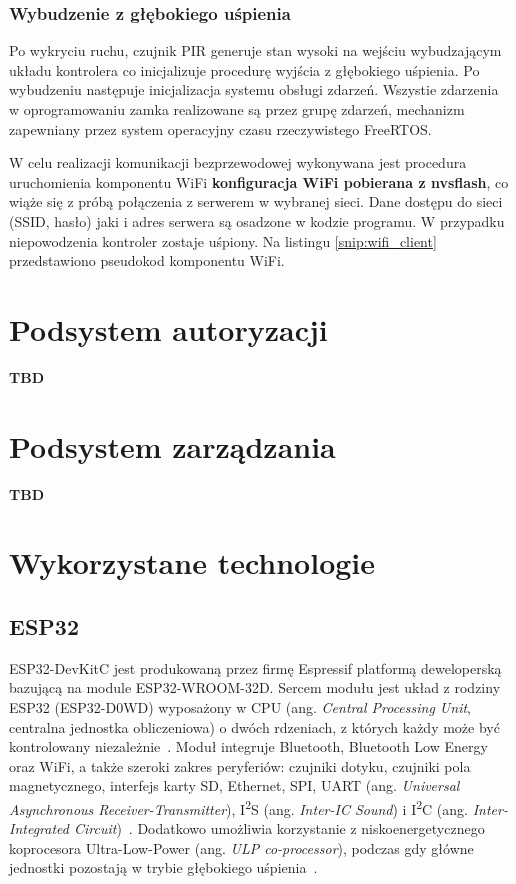             \subsubsection{Wybudzenie z głębokiego uśpienia}

                Po wykryciu ruchu, czujnik PIR generuje stan wysoki na wejściu wybudzającym układu kontrolera co inicjalizuje procedurę wyjścia z głębokiego uśpienia. Po wybudzeniu następuje inicjalizacja systemu obsługi zdarzeń. Wszystie zdarzenia w oprogramowaniu zamka realizowane są przez grupę zdarzeń, mechanizm zapewniany przez system operacyjny czasu rzeczywistego FreeRTOS.

                W celu realizacji komunikacji bezprzewodowej wykonywana jest procedura uruchomienia komponentu WiFi \textbf{konfiguracja WiFi pobierana z nvsflash}, co wiąże się z próbą połączenia z serwerem w wybranej sieci. Dane dostępu do sieci (SSID, hasło) jaki i adres serwera są osadzone w kodzie programu. W przypadku niepowodzenia kontroler zostaje uśpiony. Na listingu \ref{snip:wifi_client} przedstawiono pseudokod komponentu WiFi. 

                

    \section{Podsystem autoryzacji}
        \textbf{TBD}

    \section{Podsystem zarządzania}
        \textbf{TBD}

    \section {Wykorzystane technologie}

        \subsection{ESP32}

            ESP32-DevKitC jest produkowaną przez firmę Espressif platformą deweloperską bazującą na module ESP32-WROOM-32D. Sercem modułu jest układ z rodziny ESP32 (ESP32-D0WD) wyposażony w CPU (ang. \textit{Central Processing Unit}, centralna jednostka obliczeniowa) o dwóch rdzeniach, z których każdy może być kontrolowany niezależnie~\cite{esp32-wroom32-ds}. Moduł integruje Bluetooth, Bluetooth Low Energy oraz WiFi, a także szeroki zakres peryferiów: czujniki dotyku, czujniki pola magnetycznego, interfejs karty SD, Ethernet, SPI, UART (ang. \textit{Universal Asynchronous Receiver-Transmitter}), I\textsuperscript{2}S (ang. \textit{Inter-IC Sound}) i I\textsuperscript{2}C (ang. \textit{Inter-Integrated Circuit})~\cite{esp32-wroom32-ds}. Dodatkowo umożliwia korzystanie z niskoenergetycznego koprocesora Ultra-Low-Power (ang. \textit{ULP co-processor}), podczas gdy główne jednostki pozostają w trybie głębokiego uśpienia~\cite{esp32-tech-ref-man}.

